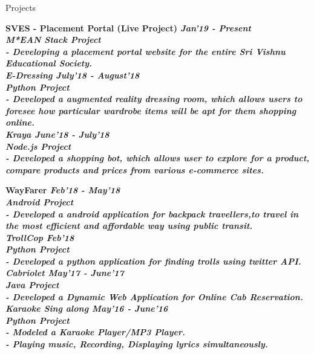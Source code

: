 \documentclass{resume}
\begin{document}
\begin{rSection}{Projects}

\bf SVES - Placement Portal (Live Project) \hfill{\em  Jan'19 - Present}\\
\textit{M*EAN Stack Project}\\
\sl - Developing a placement portal website for the entire Sri Vishnu Educational Society.\\

\bf E-Dressing \hfill{\em  July'18 - August'18}\\
\textit{Python Project}\\
\sl - Developed a augmented reality dressing room, which allows users to foresee how particular wardrobe items will be apt for them shopping online.\\

\bf Kraya \hfill{\em  June'18 - July'18}\\
\textit{Node.js Project}\\
\sl - Developed a shopping bot, which allows user to explore for a product, compare products and prices from various e-commerce sites.\\
\pagebreak 

\bf WayFarer \hfill{\em  Feb'18 - May'18}\\
\textit{Android Project}\\
\sl - Developed a android application for backpack travellers,to travel in the most efficient and affordable way using public transit.\\

\bf TrollCop \hfill{\em  Feb'18}\\
\textit{Python Project}\\
\sl - Developed a python application for finding trolls using twitter API.\\

\bf Cabriolet \hfill{\em  May'17 - June'17}\\
\textit{Java Project}\\
\sl - Developed a Dynamic Web Application for Online Cab Reservation.\\

\bf Karaoke \- Sing along \hfill{\em May'16 - June'16}\\
\textit{Python Project} \\
\sl - Modeled a Karaoke Player/MP3 Player.\\
\sl - Playing music, Recording, Displaying lyrics simultaneously.\\

\end{rSection}
\end{document}

